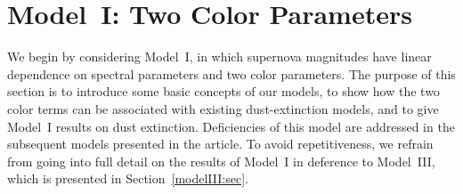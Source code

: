 \documentclass[trackchanges]{aastex62}   	%
\begin{document}
\section{Model~I: Two Color Parameters}
\label{modelI:sec}
We begin by considering Model~I, in which supernova magnitudes  have linear dependence on spectral parameters
and two color parameters. The purpose of this section is to introduce some basic concepts of our models,
to show how the two  color terms can be associated with existing dust-extinction models, and to give Model~I results on dust extinction.
Deficiencies of this model are addressed in the subsequent models presented in the article.
To avoid repetitiveness,
we refrain from going into full detail on the results of Model~I in deference to Model~III, which is presented in Section~\ref{modelIII:sec}.

\end{document}
